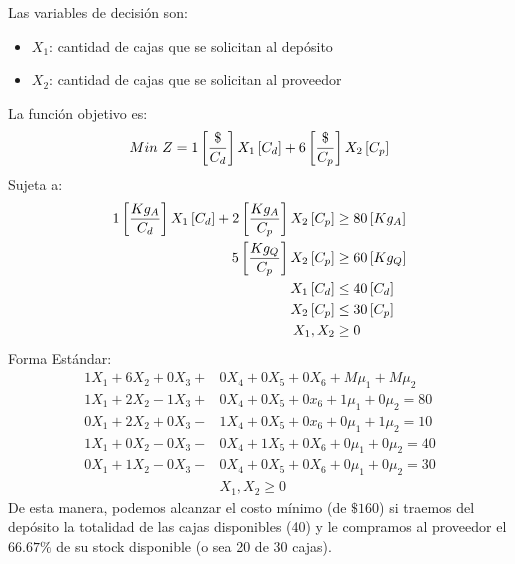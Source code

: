 \documentclass{tarea}
\begin{document}
\begin{homeworkProblem}
Las variables de decisión son:
\begin{itemize}
	\item $X_1$: cantidad de cajas que se solicitan al depósito
	\item $X_2$: cantidad de cajas  que se solicitan al proveedor 
\end{itemize}
La función objetivo es: 
\begin{equation}
	Min\ Z = 1\left[ \frac{\$}{C_d} \right]X_1\left[ C_d \right] + 6\left[ \frac{\$}{C_p} \right]X_2\left[ C_p \right]
\end{equation}
Sujeta a:
\begin{align*}
	1\left[ \frac{Kg_A}{C_d} \right]X_1\left[ C_d \right] + 2\left[ \frac{Kg_A}{C_p} \right]X_2\left[ C_p \right] &\ge 80 \left[ Kg_A \right]\\
	5\left[ \frac{Kg_Q}{C_p} \right]X_2\left[ C_p \right] &\ge 60 \left[ Kg_Q \right] \\
	X_1\left[ C_d \right] &\le 40\left[ C_d \right] \\
	X_2\left[ C_p \right] &\le 30 \left[ C_p \right] \\
	X_1,X_2 &\ge 0
\end{align*}
Forma Estándar:
\begin{align*}
	1X_1 + 6X_2 + 0X_3 + &0X_4 + 0X_5 + 0X_6 + M\mu_1 + M\mu_2 \\
	1X_1 + 2X_2 - 1X_3 +&0X_4 +0X_5 + 0x_6 + 1\mu_1 + 0\mu_2 = 80 \\
	0X_1 + 2X_2 + 0X_3 -&1X_4 +0X_5 + 0x_6 + 0\mu_1 + 1\mu_2 = 10 \\
	1X_1 + 0X_2 - 0X_3 -&0X_4 + 1X_5 + 0X_6 + 0\mu_1 + 0\mu_2 = 40 \\
	0X_1 + 1X_2 - 0X_3 -&0X_4 + 0X_5 + 0X_6 + 0\mu_1 + 0\mu_2 = 30 \\
	&X_1,X_2 \ge 0
\end{align*}
De esta manera, podemos alcanzar el costo mínimo (de $ \$ 160$) si traemos del depósito la totalidad de las cajas disponibles (40) y le compramos al proveedor el $66.67\%$ de su stock disponible (o sea 20 de 30 cajas).
\end{homeworkProblem}
\end{document}
